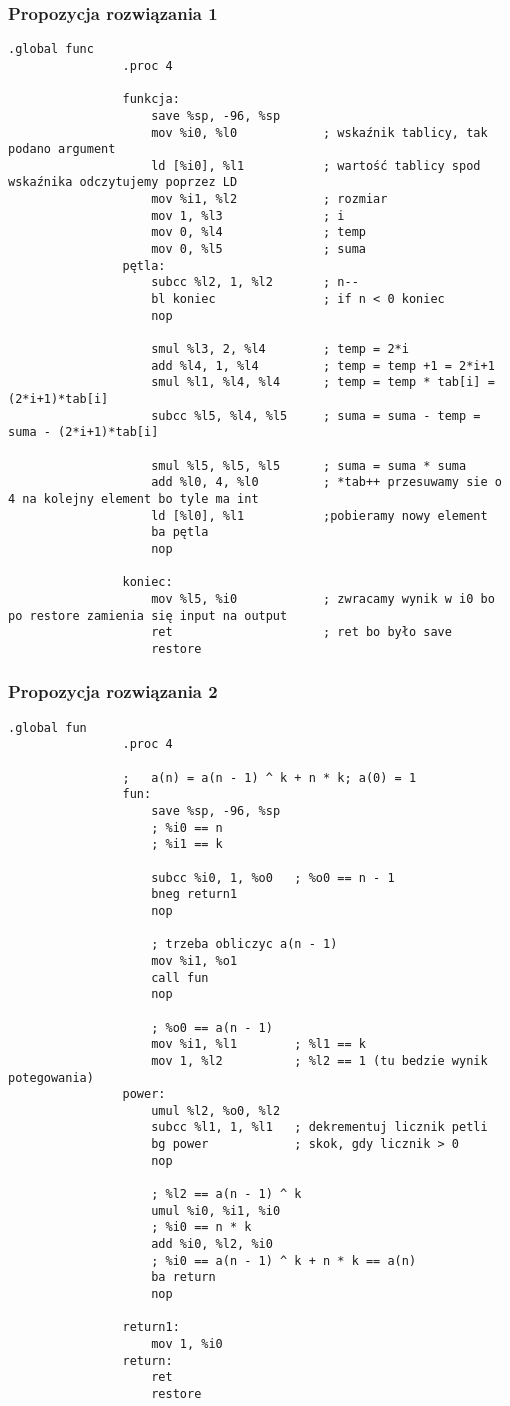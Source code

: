 		\subsubsection{Propozycja rozwiązania 1}
			\begin{lstlisting}[language={[sparc]Assembler}]
				.global func
				.proc 4
				
				funkcja:
					save %sp, -96, %sp
					mov %i0, %l0			; wskaźnik tablicy, tak podano argument
					ld [%i0], %l1			; wartość tablicy spod wskaźnika odczytujemy poprzez LD
					mov %i1, %l2			; rozmiar
					mov 1, %l3				; i
					mov 0, %l4				; temp
					mov 0, %l5				; suma
				pętla:
					subcc %l2, 1, %l2		; n--
					bl koniec				; if n < 0 koniec
					nop
					
					smul %l3, 2, %l4		; temp = 2*i
					add %l4, 1, %l4			; temp = temp +1 = 2*i+1
					smul %l1, %l4, %l4		; temp = temp * tab[i] = (2*i+1)*tab[i]
					subcc %l5, %l4, %l5		; suma = suma - temp = suma - (2*i+1)*tab[i]
					
					smul %l5, %l5, %l5		; suma = suma * suma
					add %l0, 4, %l0			; *tab++ przesuwamy sie o 4 na kolejny element bo tyle ma int
					ld [%l0], %l1			;pobieramy nowy element
					ba pętla
					nop
				
				koniec:
					mov %l5, %i0			; zwracamy wynik w i0 bo po restore zamienia się input na output
					ret						; ret bo było save
					restore
			\end{lstlisting}
		\newpage
		\subsubsection{Propozycja rozwiązania 2}
			\begin{lstlisting}[language={[sparc]Assembler}]
				.global fun
				.proc 4
				
				;   a(n) = a(n - 1) ^ k + n * k; a(0) = 1
				fun:
					save %sp, -96, %sp
					; %i0 == n
					; %i1 == k
				
					subcc %i0, 1, %o0	; %o0 == n - 1
					bneg return1
					nop
				
					; trzeba obliczyc a(n - 1)
					mov %i1, %o1
					call fun
					nop
				
					; %o0 == a(n - 1)
					mov %i1, %l1		; %l1 == k
					mov 1, %l2			; %l2 == 1 (tu bedzie wynik potegowania)
				power:
					umul %l2, %o0, %l2
					subcc %l1, 1, %l1	; dekrementuj licznik petli
					bg power			; skok, gdy licznik > 0
					nop
				
					; %l2 == a(n - 1) ^ k
					umul %i0, %i1, %i0
					; %i0 == n * k
					add %i0, %l2, %i0
					; %i0 == a(n - 1) ^ k + n * k == a(n)
					ba return
					nop
				
				return1:
					mov 1, %i0
				return:
					ret
					restore
			\end{lstlisting}
		
